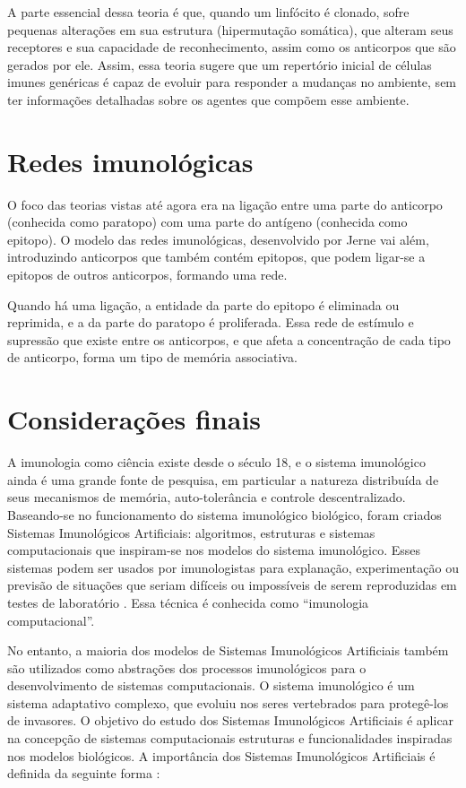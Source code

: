 A parte essencial dessa teoria é que, quando um linfócito é clonado, sofre pequenas alterações em sua estrutura (hipermutação somática), que alteram seus receptores e sua capacidade de reconhecimento, assim como os anticorpos que são gerados por ele. Assim, essa teoria sugere que um repertório inicial de células imunes genéricas é capaz de evoluir para responder a mudanças no ambiente, sem ter informações detalhadas sobre os agentes que compõem esse ambiente.

\section{Redes imunológicas}

O foco das teorias vistas até agora era na ligação entre uma parte do anticorpo (conhecida como paratopo) com uma parte do antígeno (conhecida como epitopo). O modelo das redes imunológicas, desenvolvido por Jerne \cite{Jerne1974} vai além, introduzindo anticorpos que também contém epitopos, que podem ligar-se a epitopos de outros anticorpos, formando uma rede.

Quando há uma ligação, a entidade da parte do epitopo é eliminada ou reprimida, e a da parte do paratopo é proliferada. Essa rede de estímulo e supressão que existe entre os anticorpos, e que afeta a concentração de cada tipo de anticorpo, forma um tipo de memória associativa.

\section{Considerações finais}

A imunologia como ciência existe desde o século 18, e o sistema imunológico ainda é uma grande fonte de pesquisa, em particular a natureza distribuída de seus mecanismos de memória, auto-tolerância e controle descentralizado. Baseando-se no funcionamento do sistema imunológico biológico, foram criados Sistemas Imunológicos Artificiais: algoritmos, estruturas e sistemas computacionais que inspiram-se nos modelos do sistema imunológico. Esses sistemas podem ser usados por imunologistas para explanação, experimentação ou previsão de situações que seriam difíceis ou impossíveis de serem reproduzidas em testes de laboratório \cite{Garrett2005}. Essa técnica é conhecida como ``imunologia computacional''.

No entanto, a maioria dos modelos de Sistemas Imunológicos Artificiais também são utilizados como abstrações dos processos imunológicos para o desenvolvimento de sistemas computacionais. O sistema imunológico é um sistema adaptativo complexo, que evoluiu nos seres vertebrados para protegê-los de invasores. O objetivo do estudo dos Sistemas Imunológicos Artificiais é aplicar na concepção de sistemas computacionais estruturas e funcionalidades inspiradas nos modelos biológicos. A importância dos Sistemas Imunológicos Artificiais é definida da seguinte forma \cite{Dasgupta2006}:

